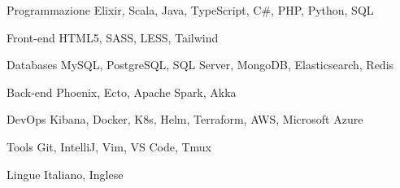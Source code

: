 \documentclass{resume} %
\begin{document}



\begin{cvSkills}


  \cvSkill
    {Programmazione}
    {Elixir, Scala, Java, TypeScript, C\#, PHP, Python, SQL}


  \cvSkill
    {Front-end}
    {HTML5, SASS, LESS, Tailwind}


  \cvSkill
    {Databases}
    {MySQL, PostgreSQL, SQL Server, MongoDB, Elasticsearch, Redis}


  \cvSkill
    {Back-end}
    {Phoenix, Ecto, Apache Spark, Akka}


  \cvSkill
    {DevOps}
    {Kibana, Docker, K8s, Helm, Terraform, AWS, Microsoft Azure}


  \cvSkill
    {Tools}
    {Git, IntelliJ, Vim, VS Code, Tmux}


  \cvSkill
    {}{}


  \cvSkill
    {Lingue}
    {Italiano, Inglese}


\end{cvSkills}
\end{document}

